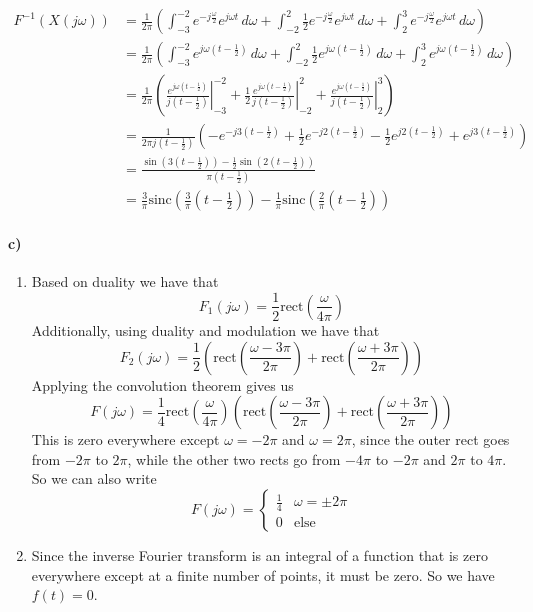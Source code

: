 \documentclass[12pt]{article}
\begin{document}
\begin{align*}
    F^{-1}(X(j\omega))&=\frac{1}{2\pi}\left(\int_{-3}^{-2} e^{-j\frac{\omega}{2}} e^{j\omega t}\,d\omega + \int_{-2}^2 \frac{1}{2}e^{-j\frac{\omega}{2}} e^{j\omega t}\,d\omega
    + \int_2^3 e^{-j\frac{\omega}{2}} e^{j\omega t}\,d\omega\right)\\
    &=\frac{1}{2\pi}\left(\int_{-3}^{-2} e^{j\omega \left(t-\frac{1}{2}\right)}\,d\omega + \int_{-2}^2 \frac{1}{2}e^{j\omega \left(t-\frac{1}{2}\right)}\,d\omega
    + \int_2^3 e^{j\omega \left(t-\frac{1}{2}\right)}\,d\omega\right)\\
    &=\frac{1}{2\pi}\left(\left.\frac{e^{j\omega \left(t-\frac{1}{2}\right)}}{j\left(t-\frac{1}{2}\right)}\right|_{-3}^{-2}
    + \frac{1}{2}\left.\frac{e^{j\omega \left(t-\frac{1}{2}\right)}}{j\left(t-\frac{1}{2}\right)}\right|_{-2}^2
    + \left.\frac{e^{j\omega \left(t-\frac{1}{2}\right)}}{j\left(t-\frac{1}{2}\right)}\right|_2^3\right)\\
    &=\frac{1}{2\pi j\left(t-\frac{1}{2}\right)}\left(-e^{-j3\left(t-\frac{1}{2}\right)}+\frac{1}{2}e^{-j2\left(t-\frac{1}{2}\right)}-\frac{1}{2}e^{j2\left(t-\frac{1}{2}\right)}
    +e^{j3\left(t-\frac{1}{2}\right)}\right)\\
    &=\frac{\sin\left(3\left(t-\frac{1}{2}\right)\right)-\frac{1}{2}\sin\left(2\left(t-\frac{1}{2}\right)\right)}{\pi\left(t-\frac{1}{2}\right)}\\
    &=\frac{3}{\pi}\text{sinc}\left(\frac{3}{\pi}\left(t-\frac{1}{2}\right)\right)-\frac{1}{\pi}\text{sinc}\left(\frac{2}{\pi}\left(t-\frac{1}{2}\right)\right)
\end{align*}

\paragraph{c)}

\begin{enumerate}
    \item Based on duality we have that
    \[F_1(j\omega)=\frac{1}{2}\text{rect}\left(\frac{\omega}{4\pi}\right)\]
    Additionally, using duality and modulation we have that
    \[F_2(j\omega)=\frac{1}{2}\left(\text{rect}\left(\frac{\omega-3\pi}{2\pi}\right)+\text{rect}\left(\frac{\omega+3\pi}{2\pi}\right)\right)\]
    Applying the convolution theorem gives us
    \[F(j\omega)=\frac{1}{4}\text{rect}\left(\frac{\omega}{4\pi}\right)\left(\text{rect}\left(\frac{\omega-3\pi}{2\pi}\right)+\text{rect}\left(\frac{\omega+3\pi}{2\pi}\right)\right)\]
    This is zero everywhere except \(\omega=-2\pi\) and \(\omega=2\pi\), since the outer rect goes from \(-2\pi\) to \(2\pi\), while the other two rects go from \(-4\pi\) to \(-2\pi\) and
    \(2\pi\) to \(4\pi\). So we can also write
    \[F(j\omega)=\begin{cases}
        \frac{1}{4} & \omega=\pm 2\pi\\
        0 & \text{else}
    \end{cases}\]
    \item Since the inverse Fourier transform is an integral of a function that is zero everywhere except at a finite number of points, it must be zero. So we have \(f(t)=0\).
\end{enumerate}
\end{document}
